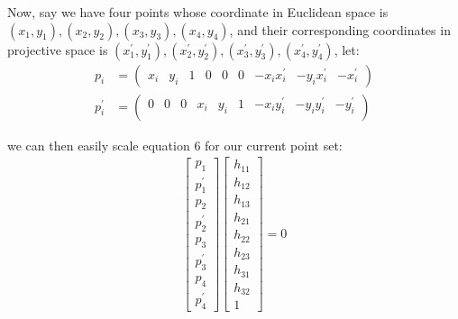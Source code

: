 \documentclass[conference]{IEEEtran}
\begin{document}
\noindent Now, say we have four points whose coordinate in Euclidean space is $(x_1, y_1), (x_2, y_2), (x_3, y_3), (x_4, y_4)$, and their corresponding coordinates in projective space is $(x_1^\prime, y_1^\prime), (x_2^\prime, y_2^\prime), (x_3^\prime, y_3^\prime), (x_4^\prime, y_4^\prime)$, let:
\begin{equation}
	\begin{split}
		p_i &= 
		\begin{pmatrix}
			x_i & y_i & 1 & 0 & 0 & 0 & -x_ix_i^\prime & -y_ix_i^\prime & -x_i^\prime
		\end{pmatrix}\\
		p_i^\prime& = 
		\begin{pmatrix}
			0 & 0 & 0 & x_i & y_i & 1 & -x_iy_i^\prime & -y_iy_i^\prime & -y_i^\prime \\
		\end{pmatrix}
	\end{split}
\end{equation}

\noindent we can then easily scale equation 6 for our current point set:
\begin{equation}
	\begin{split}
		\begin{bmatrix}
			p_1 \\
			p_1^\prime \\
			p_2 \\
			p_2^\prime \\
			p_3 \\
			p_3^\prime \\
			p_4 \\
			p_4^\prime
		\end{bmatrix}
		\begin{bmatrix}
			h_{11} \\
			h_{12} \\
			h_{13} \\
			h_{21} \\
			h_{22} \\
			h_{23} \\
			h_{31} \\
			h_{32} \\
			1
		\end{bmatrix} = 0
	\end{split}
\end{equation}
\end{document}
